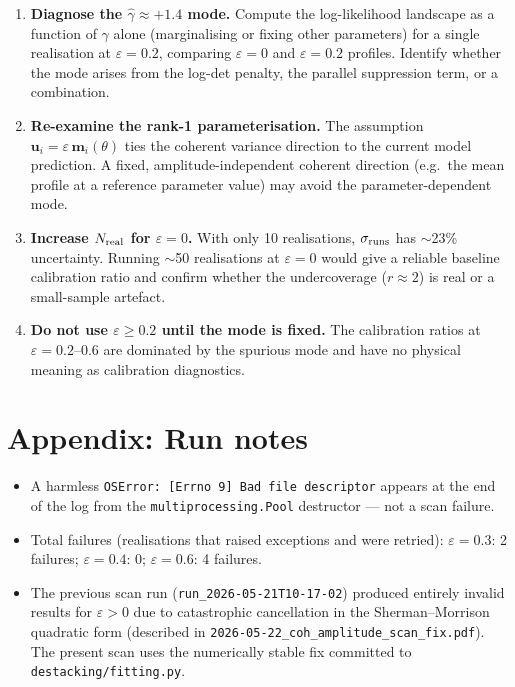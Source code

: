 \documentclass[11pt,a4paper]{article}
\begin{document}
\begin{enumerate}

\item \textbf{Diagnose the $\hat\gamma \approx +1.4$ mode.}
  Compute the log-likelihood landscape as a function of $\gamma$ alone
  (marginalising or fixing other parameters) for a single realisation at
  $\varepsilon = 0.2$, comparing $\varepsilon=0$ and $\varepsilon=0.2$ profiles.
  Identify whether the mode arises from the log-det penalty, the parallel
  suppression term, or a combination.

\item \textbf{Re-examine the rank-1 parameterisation.}
  The assumption $\mathbf{u}_i = \varepsilon\,\mathbf{m}_i(\theta)$ ties the
  coherent variance direction to the current model prediction.  A fixed,
  amplitude-independent coherent direction (e.g.\ the mean profile at a
  reference parameter value) may avoid the parameter-dependent mode.

\item \textbf{Increase $N_{\rm real}$ for $\varepsilon=0$.}
  With only 10 realisations, $\sigma_{\rm runs}$ has $\sim$23\% uncertainty.
  Running $\sim$50 realisations at $\varepsilon=0$ would give a reliable
  baseline calibration ratio and confirm whether the undercoverage ($r\approx2$)
  is real or a small-sample artefact.

\item \textbf{Do not use $\varepsilon \ge 0.2$ until the mode is fixed.}
  The calibration ratios at $\varepsilon = 0.2$--$0.6$ are dominated by the
  spurious mode and have no physical meaning as calibration diagnostics.

\end{enumerate}

\section*{Appendix: Run notes}

\begin{itemize}
  \item A harmless \texttt{OSError: [Errno 9] Bad file descriptor} appears at
    the end of the log from the \texttt{multiprocessing.Pool} destructor — not
    a scan failure.
  \item Total failures (realisations that raised exceptions and were retried):
    $\varepsilon=0.3$: 2 failures; $\varepsilon=0.4$: 0; $\varepsilon=0.6$: 4 failures.
  \item The previous scan run (\texttt{run\_2026-05-21T10-17-02}) produced
    entirely invalid results for $\varepsilon>0$ due to catastrophic cancellation
    in the Sherman--Morrison quadratic form (described in
    \texttt{2026-05-22\_coh\_amplitude\_scan\_fix.pdf}).
    The present scan uses the numerically stable fix committed to
    \texttt{destacking/fitting.py}.
\end{itemize}
\end{document}
